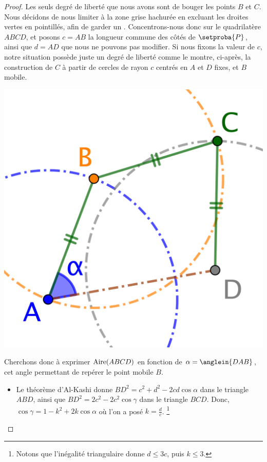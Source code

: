 \begin{proof}
	Les seuls degré de liberté que nous avons sont de bouger les points $B$ et $C$. Nous décidons de nous limiter à la zone grise hachurée en excluant les droites vertes en pointillés, afin de garder un \ngone.
	Concentrons-nous donc sur le quadrilatère $ABCD$, et posons $c = AB$ la longueur commune des côtés de $\setproba{P}$, ainsi que $d = AD$ que nous ne pouvons pas modifier.
	Si nous fixons la valeur de $c$, notre situation possède juste un degré de liberté comme le montre, ci-après, la construction de $C$ à partir de cercles de rayon $c$ centrés en $A$ et $D$ fixes, et $B$ mobile.
	\begin{center}
		\includegraphics[scale=.4]{content/polygon/sol-must-be/2-eq-angles-circle.png}
	\end{center}
	
	Cherchons donc à exprimer $\mathrm{Aire}(ABCD)$ en fonction de $\alpha = \anglein{DAB}$, cet angle permettant de repérer le point mobile $B$.
	\begin{itemize}
	    \item Le théorème d'Al-Kashi donne
	    $BD^2 = c^2 + d^2 - 2 c d \cos \alpha$ dans le triangle $ABD$,
	    ainsi que
	    $BD^2 = 2 c^2 - 2 c^2 \cos \gamma$ dans le triangle $BCD$.
	    Donc,
	    $\cos \gamma = 1 - k^2 + 2 k \cos \alpha$ où l'on a posé $k = \frac{d}{c}$.%
	    \footnote{
	    	Notons que l'inégalité triangulaire donne $d \leq 3 c$, puis $k \leq 3$.
		}



\end{itemize}
\end{proof}
